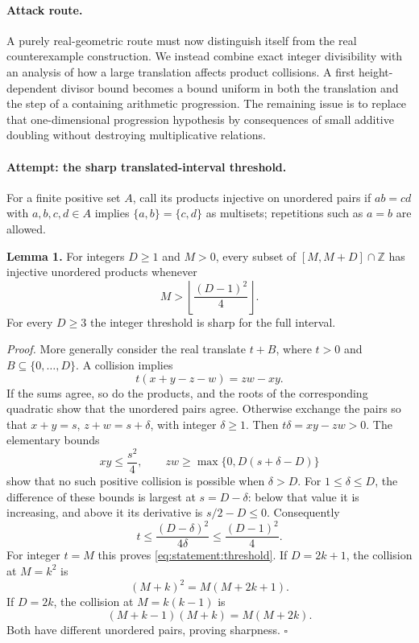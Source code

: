 \documentclass[11pt,a4paper]{article}
\newcommand{\Z}{\mathbb{Z}}
\numberwithin{equation}{section}
\begin{document}
\paragraph{Attack route.}
A purely real-geometric route must now distinguish itself from the real
counterexample construction. We instead combine exact integer divisibility
with an analysis of how a large translation affects product collisions.
A first height-dependent divisor bound becomes a bound uniform in both
the translation and the step of a containing arithmetic progression.
The remaining issue is to replace that one-dimensional progression
hypothesis by consequences of small additive doubling without destroying
multiplicative relations.

\paragraph{Attempt: the sharp translated-interval threshold.}
For a finite positive set $A$, call its products injective on unordered
pairs if $ab=cd$ with $a,b,c,d\in A$ implies $\{a,b\}=\{c,d\}$ as
multisets; repetitions such as $a=b$ are allowed.

\textbf{Lemma 1.} For integers $D\geq1$ and $M>0$, every subset of
$[M,M+D]\cap\Z$ has injective unordered products whenever
\begin{equation}\label{eq:statement:threshold}
 M>\left\lfloor\frac{(D-1)^2}{4}\right\rfloor.
\end{equation}
For every $D\geq3$ the integer threshold is sharp for the full interval.

\emph{Proof.} More generally consider the real translate
$t+B$, where $t>0$ and $B\subseteq\{0,\ldots,D\}$. A collision implies
\[
 t(x+y-z-w)=zw-xy.
\]
If the sums agree, so do the products, and the roots of the corresponding
quadratic show that the unordered pairs agree. Otherwise exchange the
pairs so that $x+y=s$, $z+w=s+\delta$, with integer $\delta\geq1$.
Then $t\delta=xy-zw>0$. The elementary bounds
\[
 xy\leq\frac{s^2}{4},\qquad
 zw\geq\max\{0,D(s+\delta-D)\}
\]
show that no such positive collision is possible when $\delta>D$.
For $1\leq\delta\leq D$, the difference of these bounds is largest at
$s=D-\delta$: below that value it is increasing, and above it its
derivative is $s/2-D\leq0$. Consequently
\[
 t\leq\frac{(D-\delta)^2}{4\delta}
 \leq\frac{(D-1)^2}{4}.
\]
For integer $t=M$ this proves \eqref{eq:statement:threshold}.
If $D=2k+1$, the collision at $M=k^2$ is
\[
 (M+k)^2=M(M+2k+1).
\]
If $D=2k$, the collision at $M=k(k-1)$ is
\[
 (M+k-1)(M+k)=M(M+2k).
\]
Both have different unordered pairs, proving sharpness. $\square$
\end{document}
